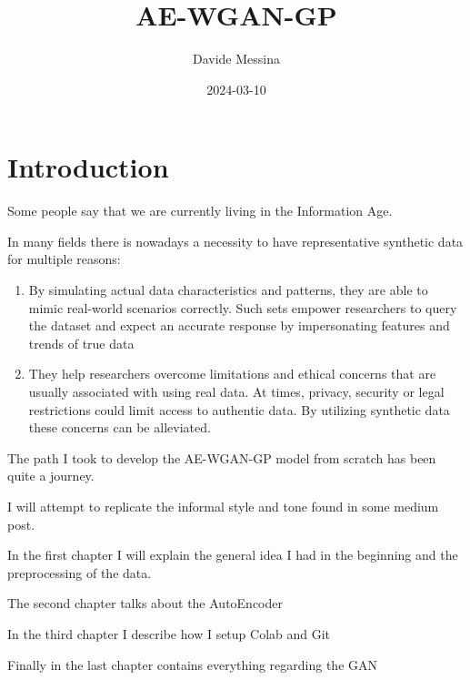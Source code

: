 \documentclass[
  letterpaper,
  DIV=11,
  numbers=noendperiod]{scrreprt}
\title{AE-WGAN-GP}
\author{Davide Messina}
\date{2024-03-10}
\renewcommand*\contentsname{Table of contents}
\newcommand\contentsname{Table of contents}
\begin{document}
\maketitle
\ifdefined\Shaded\renewenvironment{Shaded}{\begin{tcolorbox}[interior hidden, borderline west={3pt}{0pt}{shadecolor}, enhanced, breakable, frame hidden, boxrule=0pt, sharp corners]}{\end{tcolorbox}}\fi

\renewcommand*\contentsname{Table of contents}
{
\hypersetup{linkcolor=}
\setcounter{tocdepth}{2}
\tableofcontents
}
\hypertarget{introduction}{%
\chapter{Introduction}\label{introduction}}

Some people say that we are currently living in the Information Age.

In many fields there is nowadays a necessity to have representative
synthetic data for multiple reasons:

\begin{enumerate}
\def\labelenumi{\arabic{enumi})}
\item
  By simulating actual data characteristics and patterns, they are able
  to mimic real-world scenarios correctly. Such sets empower researchers
  to query the dataset and expect an accurate response by impersonating
  features and trends of true data
\item
  They help researchers overcome limitations and ethical concerns that
  are usually associated with using real data. At times, privacy,
  security or legal restrictions could limit access to authentic data.
  By utilizing synthetic data these concerns can be alleviated.
\end{enumerate}

The path I took to develop the AE-WGAN-GP model from scratch has been
quite a journey.

I will attempt to replicate the informal style and tone found in some
medium post.

In the first chapter I will explain the general idea I had in the
beginning and the preprocessing of the data.

The second chapter talks about the AutoEncoder

In the third chapter I describe how I setup Colab and Git

Finally in the last chapter contains everything regarding the GAN
\end{document}
